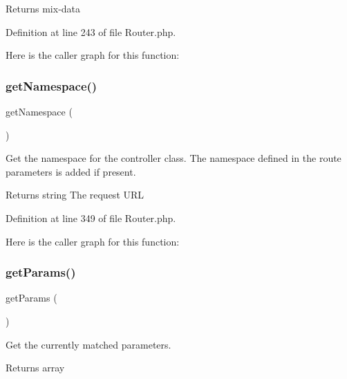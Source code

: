 \begin{DoxyReturn}{Returns}
mix-\/data 
\end{DoxyReturn}


Definition at line 243 of file Router.\+php.

Here is the caller graph for this function\+:
\mbox{\label{class_zest_1_1_router_1_1_router_a2614df64646ac71b70b1e1074258052b}} 
\subsubsection{\texorpdfstring{get\+Namespace()}{getNamespace()}}
{\footnotesize\ttfamily get\+Namespace (\begin{DoxyParamCaption}{ }\end{DoxyParamCaption})\hspace{0.3cm}{\ttfamily [protected]}}

Get the namespace for the controller class. The namespace defined in the route parameters is added if present.

\begin{DoxyReturn}{Returns}
string The request U\+RL 
\end{DoxyReturn}


Definition at line 349 of file Router.\+php.

Here is the caller graph for this function\+:
\mbox{\label{class_zest_1_1_router_1_1_router_ae32cd7c32721b02d676bb63b4b1366db}} 
\subsubsection{\texorpdfstring{get\+Params()}{getParams()}}
{\footnotesize\ttfamily get\+Params (\begin{DoxyParamCaption}{ }\end{DoxyParamCaption})}

Get the currently matched parameters.

\begin{DoxyReturn}{Returns}
array 
\end{DoxyReturn}


